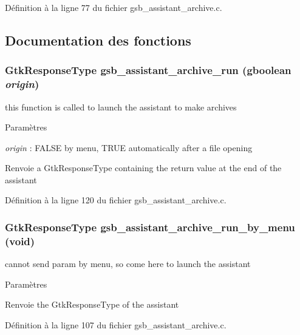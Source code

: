 Définition à la ligne 77 du fichier gsb\_\-assistant\_\-archive.c.



\subsection{Documentation des fonctions}
\subsubsection[{gsb\_\-assistant\_\-archive\_\-run}]{\setlength{\rightskip}{0pt plus 5cm}GtkResponseType gsb\_\-assistant\_\-archive\_\-run (gboolean {\em origin})}\label{gsb__assistant__archive_8c_ab704558aef7214e869b6a9a3a87d0b1f}
this function is called to launch the assistant to make archives


\begin{DoxyParams}{Paramètres}
\item[{\em origin}]: FALSE by menu, TRUE automatically after a file opening\end{DoxyParams}
\begin{DoxyReturn}{Renvoie}
a GtkResponseType containing the return value at the end of the assistant 
\end{DoxyReturn}


Définition à la ligne 120 du fichier gsb\_\-assistant\_\-archive.c.

\subsubsection[{gsb\_\-assistant\_\-archive\_\-run\_\-by\_\-menu}]{\setlength{\rightskip}{0pt plus 5cm}GtkResponseType gsb\_\-assistant\_\-archive\_\-run\_\-by\_\-menu (void)}\label{gsb__assistant__archive_8c_a57e51811453ac3de14dd07bfa3b752e2}
cannot send param by menu, so come here to launch the assistant


\begin{DoxyParams}{Paramètres}
\item[{\em }]\end{DoxyParams}
\begin{DoxyReturn}{Renvoie}
the GtkResponseType of the assistant 
\end{DoxyReturn}


Définition à la ligne 107 du fichier gsb\_\-assistant\_\-archive.c.

